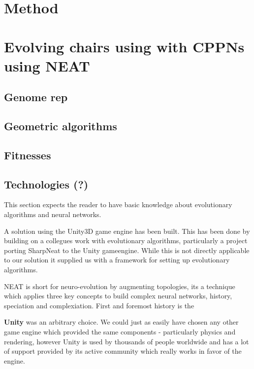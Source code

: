 \section{Method}
\section{Evolving chairs using with CPPNs using NEAT }
\subsection{Genome rep}
\subsection{Geometric algorithms}
\subsection{Fitnesses}
\subsection{Technologies (?)}
This section expects the reader to have basic knowledge about evolutionary algorithms and neural networks.


A solution using the Unity3D\cite{web:unity} game engine has been built. This has been done by building on a collegues work with evolutionary algorithms, particularly a project porting SharpNeat\cite{web:unityneat} to the Unity gameengine\cite{web:sharpneat}. While this is not directly applicable to our solution it supplied us with a framework for setting up evolutionary algorithms.

NEAT is short for neuro-evolution by augmenting topologies, its a technique which applies three key concepts to build complex neural networks, history, speciation and complexiation. First and foremost history is the 
    
\textbf{Unity} was an arbitrary choice. We could just as easily have chosen any other game engine which provided the same components - particularly physics and rendering, however Unity is used by thousands of people worldwide and has a lot of support provided by its active community which really works in favor of the engine.


